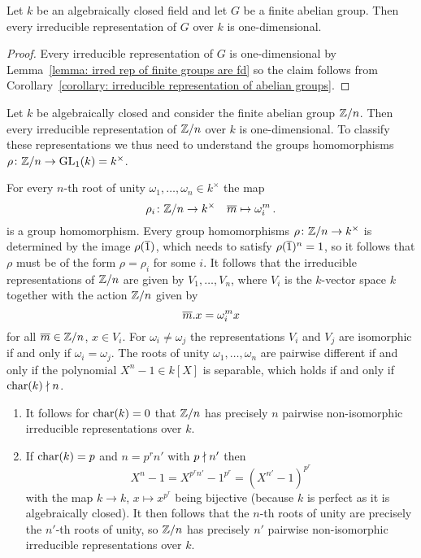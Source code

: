 \begin{corollary}
  Let $k$ be an algebraically closed field and let $G$ be a finite abelian group.
  Then every irreducible representation of $G$ over $k$ is one-dimensional.
\end{corollary}


\begin{proof}
  Every irreducible representation of $G$ is one-dimensional by Lemma~\ref{lemma: irred rep of finite groups are fd} so the claim follows from Corollary~\ref{corollary: irreducible representation of abelian groups}.
\end{proof}


\begin{example}
  \label{example: irreducible representations for Zn}
  Let $k$ be algebraically closed and consider the finite abelian group $\mathbb{Z}/n$.
  Then every irreducible representation of $\mathbb{Z}/n$ over $k$ is one-dimensional.
  To classify these representations we thus need to understand the groups homomorphisms $\rho \colon \mathbb{Z}/n \to \operatorname{GL}_1(k) = k^\times$.
  
  For every $n$-th root of unity $\omega_1, \dotsc, \omega_n \in k^\times$ the map
  \[
            \rho_i
    \colon  \mathbb{Z}/n
    \to     k^\times
    \quad   \overline{m}
    \mapsto \omega_i^m \,.
  \]
  is a group homomorphism.
  Every group homomorphisms $\rho \colon \mathbb{Z}/n \to k^\times$ is determined by the image $\rho(\overline{1})$, which needs to satisfy $\rho(\overline{1})^n = 1$, so it follows that $\rho$ must be of the form $\rho = \rho_i$ for some $i$.
  It follows that the irreducible representations of $\mathbb{Z}/n$ are given by $V_1, \dotsc, V_n$, where $V_i$ is the $k$-vector space $k$ together with the action $\mathbb{Z}/n$ given by
  \[
      \overline{m}.x
    = \omega_i^m x
  \]
  for all $\overline{m} \in \mathbb{Z}/n$, $x \in V_i$.
  For $\omega_i \neq \omega_j$ the representations $V_i$ and $V_j$ are isomorphic if and only if $\omega_i = \omega_j$.
  The roots of unity $\omega_1, \dotsc, \omega_n$ are pairwise different if and only if the polynomial $X^n - 1 \in k[X]$ is separable, which holds if and only if $\operatorname{char}(k) \nmid n$.
  \begin{enumerate}
    \item
      It follows for $\operatorname{char}(k) = 0$ that $\mathbb{Z}/n$ has precisely $n$ pairwise non-isomorphic irreducible representations over $k$.
    \item
      If $\operatorname{char}(k) = p$ and $n = p^r n'$ with $p \nmid n'$ then
      \[
          X^n - 1
        = X^{p^r n'} - 1^{p^r}
        = (X^{n'} - 1)^{p^r}
      \]
      with the map $k \to k$, $x \mapsto x^{p^r}$ being bijective (because $k$ is perfect as it is algebraically closed).
      It then follows that the $n$-th roots of unity are precisely the $n'$-th roots of unity, so $\mathbb{Z}/n$ has precisely $n'$ pairwise non-isomorphic irreducible representations over $k$.
  \end{enumerate}
\end{example}


